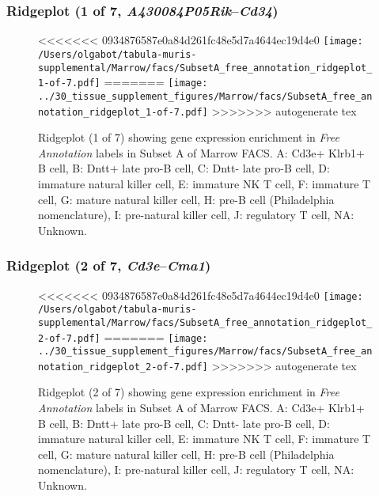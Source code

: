 \clearpage

\subsubsection{Ridgeplot (1 of 7, \emph{A430084P05Rik}--\emph{Cd34})}
\begin{figure}[h]
\centering
<<<<<<< 0934876587e0a84d261fc48e5d7a4644ec19d4e0
\texttt{[image: /Users/olgabot/tabula-muris-supplemental/Marrow/facs/SubsetA\_free\_annotation\_ridgeplot\_1-of-7.pdf]}
=======
\texttt{[image: ../30\_tissue\_supplement\_figures/Marrow/facs/SubsetA\_free\_annotation\_ridgeplot\_1-of-7.pdf]}
>>>>>>> autogenerate tex

\caption{ Ridgeplot (1 of 7)  showing gene expression enrichment in \emph{Free Annotation} labels in Subset A of Marrow FACS. A: Cd3e+ Klrb1+ B cell, B: Dntt+ late pro-B cell, C: Dntt- late pro-B cell, D: immature natural killer cell, E: immature NK T cell, F: immature T cell, G: mature natural killer cell, H: pre-B cell (Philadelphia nomenclature), I: pre-natural killer cell, J: regulatory T cell, NA: Unknown.}
\end{figure}


\clearpage

\subsubsection{Ridgeplot (2 of 7, \emph{Cd3e}--\emph{Cma1})}
\begin{figure}[h]
\centering
<<<<<<< 0934876587e0a84d261fc48e5d7a4644ec19d4e0
\texttt{[image: /Users/olgabot/tabula-muris-supplemental/Marrow/facs/SubsetA\_free\_annotation\_ridgeplot\_2-of-7.pdf]}
=======
\texttt{[image: ../30\_tissue\_supplement\_figures/Marrow/facs/SubsetA\_free\_annotation\_ridgeplot\_2-of-7.pdf]}
>>>>>>> autogenerate tex

\caption{ Ridgeplot (2 of 7)  showing gene expression enrichment in \emph{Free Annotation} labels in Subset A of Marrow FACS. A: Cd3e+ Klrb1+ B cell, B: Dntt+ late pro-B cell, C: Dntt- late pro-B cell, D: immature natural killer cell, E: immature NK T cell, F: immature T cell, G: mature natural killer cell, H: pre-B cell (Philadelphia nomenclature), I: pre-natural killer cell, J: regulatory T cell, NA: Unknown.}
\end{figure}


\clearpage

